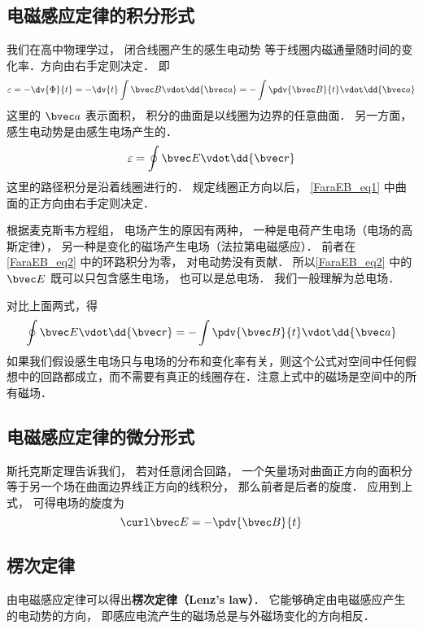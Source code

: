 
\begin{issues}
\issueAbstract
\issueTODO
\end{issues}


\subsection{电磁感应定律的积分形式}

我们在高中物理学过， 闭合线圈产生的感生电动势 %
等于线圈内磁通量随时间的变化率．方向由右手定则决定． 即
\begin{equation}\label{FaraEB_eq1}
\varepsilon  =  -\dv{\Phi}{t} =  - \dv{t} \int \bvec B \vdot \dd{\bvec a} =  - \int \pdv{\bvec B}{t} \vdot \dd{\bvec a}
\end{equation} 
这里的 $\bvec a$ 表示面积， 积分的曲面是以线圈为边界的任意曲面． 另一方面，感生电动势是由感生电场产生的． 
\begin{equation}\label{FaraEB_eq2}
\varepsilon  = \oint \bvec E \vdot \dd{\bvec r}
\end{equation}
这里的路径积分是沿着线圈进行的． 规定线圈正方向以后， \autoref{FaraEB_eq1} 中曲面的正方向由右手定则决定．

根据麦克斯韦方程组， 电场产生的原因有两种， 一种是电荷产生电场（电场的高斯定律）， 另一种是变化的磁场产生电场（法拉第电磁感应）． 前者在\autoref{FaraEB_eq2} 中的环路积分为零， 对电动势没有贡献． 所以\autoref{FaraEB_eq2} 中的 $\bvec E$ 既可以只包含感生电场， 也可以是总电场． 我们一般理解为总电场．

对比上面两式，得
\begin{equation}
\oint \bvec E \vdot \dd{\bvec r}  =  - \int \pdv{\bvec B}{t} \vdot \dd{\bvec a} 
\end{equation} 
如果我们假设感生电场只与电场的分布和变化率有关，则这个公式对空间中任何假想中的回路都成立，而不需要有真正的线圈存在．注意上式中的磁场是空间中的所有磁场．

\subsection{电磁感应定律的微分形式}
斯托克斯定理告诉我们， 若对任意闭合回路， 一个矢量场对曲面正方向的面积分等于另一个场在曲面边界线正方向的线积分， 那么前者是后者的旋度．
应用到上式， 可得电场的旋度为
\begin{equation}\label{FaraEB_eq3}
\curl \bvec E =  - \pdv{\bvec B}{t}
\end{equation} 

\subsection{楞次定律}
由电磁感应定律可以得出\textbf{楞次定律（Lenz's law）}． 它能够确定由电磁感应产生的电动势的方向， 即感应电流产生的磁场总是与外磁场变化的方向相反． 
